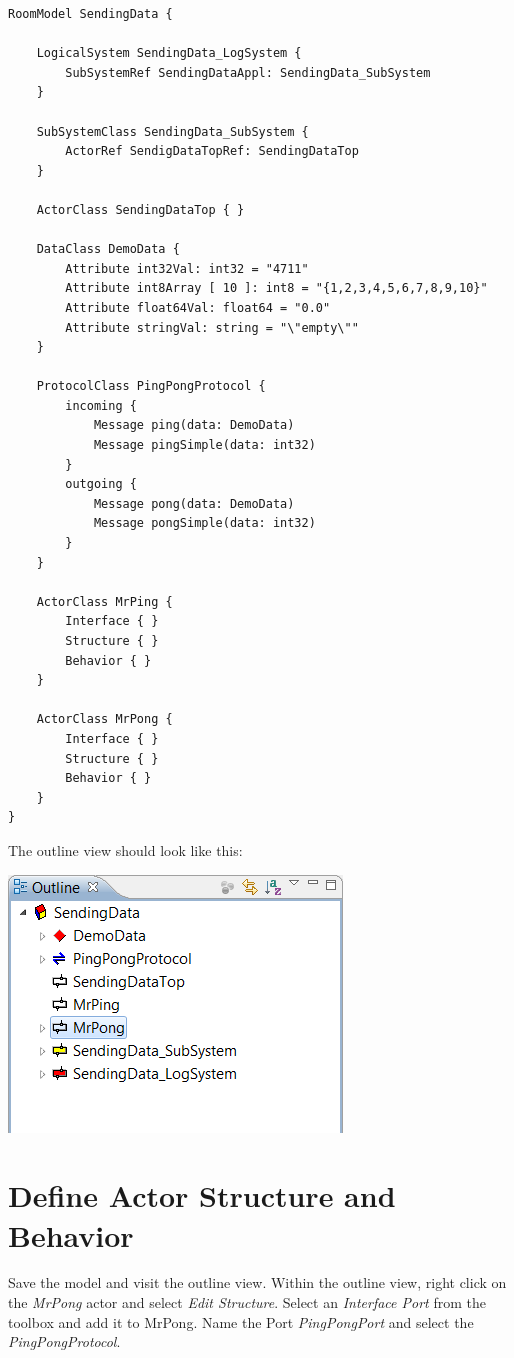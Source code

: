 \begin{verbatim}
RoomModel SendingData {

    LogicalSystem SendingData_LogSystem {
        SubSystemRef SendingDataAppl: SendingData_SubSystem
    }

    SubSystemClass SendingData_SubSystem {
        ActorRef SendigDataTopRef: SendingDataTop
    }

    ActorClass SendingDataTop { }

    DataClass DemoData {
        Attribute int32Val: int32 = "4711"
        Attribute int8Array [ 10 ]: int8 = "{1,2,3,4,5,6,7,8,9,10}"
        Attribute float64Val: float64 = "0.0"
        Attribute stringVal: string = "\"empty\""
    }

    ProtocolClass PingPongProtocol {
        incoming {
            Message ping(data: DemoData)
            Message pingSimple(data: int32)
        }
        outgoing {
            Message pong(data: DemoData)
            Message pongSimple(data: int32)
        }
    }

    ActorClass MrPing {
        Interface { }
        Structure { }
        Behavior { }
    }

    ActorClass MrPong {
        Interface { }
        Structure { }
        Behavior { }
    }
} 

\end{verbatim}

The outline view should look like this:

\includegraphics{images/025-SendingData03.png}

\section{Define Actor Structure and Behavior}

Save the model and visit the outline view. Within the outline view, right click on the \textit{MrPong} actor and select \textit{Edit Structure}. Select an \textit{Interface Port} from the toolbox and add it to MrPong. Name the Port \textit{PingPongPort} and select the \textit{PingPongProtocol}.

